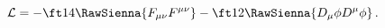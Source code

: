 \begin{equation}
  {\cal L}=-\ft14 \RawSienna{F_{\mu \nu }F^{\mu \nu }}-\ft12\RawSienna{D_\mu \phi D^\mu \phi}
  \,.
 \label{L10}
\end{equation}

